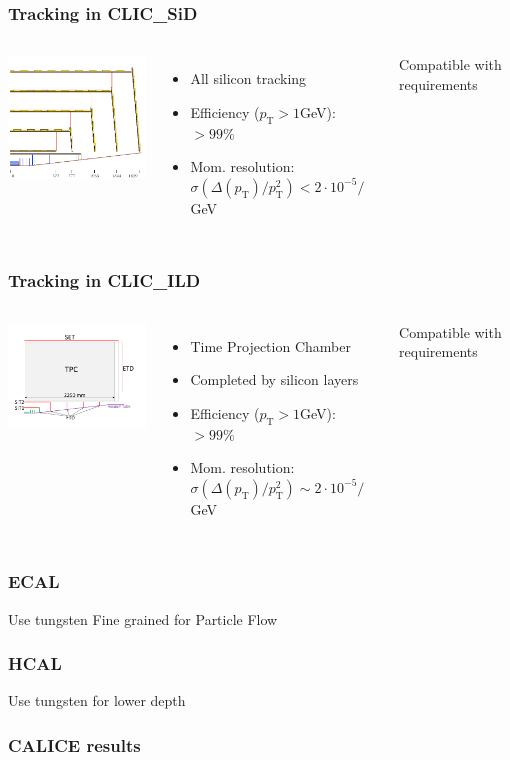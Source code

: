 \documentclass{beamer}
\begin{document}
\begin{frame}
\frametitle{Tracking in CLIC\_SiD}
\begin{columns}[c]
\column{6cm}
\begin{center}
\includegraphics[width=6cm]{sid_tracker_zx.pdf}
\end{center}
\column{6cm}
\begin{itemize}
  \item All silicon tracking
  \item Efficiency ($p_{\textrm{T}}>1$GeV): $>99\%$
  \item Mom. resolution: $\sigma(\Delta(p_{\textrm{T}})/p_{\textrm{T}}^2)<
  2\cdot10^{-5}/$GeV
\end{itemize}
\alert{Compatible with requirements}
\end{columns}
\end{frame}
\begin{frame}
\frametitle{Tracking in CLIC\_ILD}
\begin{columns}[c]
\column{6cm}
\begin{center}
\includegraphics[width=6cm]{CLIC_ILD_tracking_geom.pdf}
\end{center}
\column{6cm}
\begin{itemize}
  \item Time Projection Chamber
  \item Completed by silicon layers
  \item Efficiency ($p_{\textrm{T}}>1$GeV): $>99\%$
  \item Mom. resolution: $\sigma(\Delta(p_{\textrm{T}})/p_{\textrm{T}}^2)\sim 2\cdot10^{-5}/$GeV
\end{itemize}
\alert{Compatible with requirements}
\end{columns}
\end{frame}
\begin{frame}
\frametitle{ECAL}
Use tungsten Fine grained for Particle Flow
\end{frame}
\begin{frame}
\frametitle{HCAL}
Use tungsten for lower depth
\end{frame}
\begin{frame}
\frametitle{CALICE results}
\end{frame}
\end{document}
